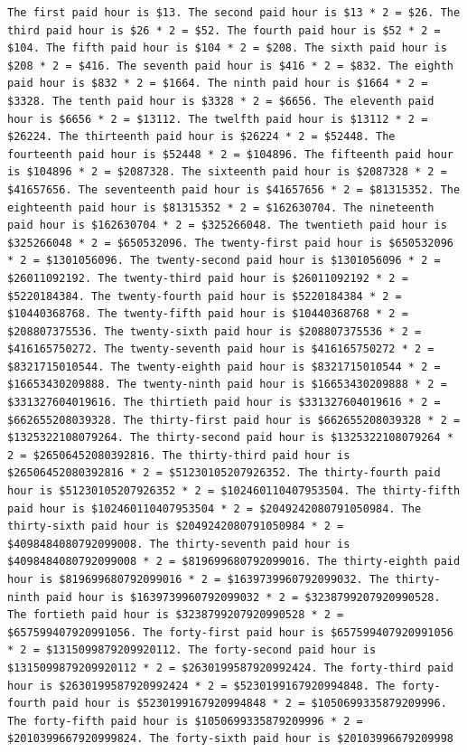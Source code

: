 \documentclass[11pt]{article}
\begin{document}
\begin{lstlisting}[caption={phi-2's answer to question: ``\textit{Liam hires a luxury car from 3 PM to 9 PM. He gets 1 hours free. The first paid hour is \$13 and each hour after that is twice the cost. How much did he pay?}''.}]
The first paid hour is $13. The second paid hour is $13 * 2 = $26. The third paid hour is $26 * 2 = $52. The fourth paid hour is $52 * 2 = $104. The fifth paid hour is $104 * 2 = $208. The sixth paid hour is $208 * 2 = $416. The seventh paid hour is $416 * 2 = $832. The eighth paid hour is $832 * 2 = $1664. The ninth paid hour is $1664 * 2 = $3328. The tenth paid hour is $3328 * 2 = $6656. The eleventh paid hour is $6656 * 2 = $13112. The twelfth paid hour is $13112 * 2 = $26224. The thirteenth paid hour is $26224 * 2 = $52448. The fourteenth paid hour is $52448 * 2 = $104896. The fifteenth paid hour is $104896 * 2 = $2087328. The sixteenth paid hour is $2087328 * 2 = $41657656. The seventeenth paid hour is $41657656 * 2 = $81315352. The eighteenth paid hour is $81315352 * 2 = $162630704. The nineteenth paid hour is $162630704 * 2 = $325266048. The twentieth paid hour is $325266048 * 2 = $650532096. The twenty-first paid hour is $650532096 * 2 = $1301056096. The twenty-second paid hour is $1301056096 * 2 = $26011092192. The twenty-third paid hour is $26011092192 * 2 = $5220184384. The twenty-fourth paid hour is $5220184384 * 2 = $10440368768. The twenty-fifth paid hour is $10440368768 * 2 = $208807375536. The twenty-sixth paid hour is $208807375536 * 2 = $416165750272. The twenty-seventh paid hour is $416165750272 * 2 = $8321715010544. The twenty-eighth paid hour is $8321715010544 * 2 = $16653430209888. The twenty-ninth paid hour is $16653430209888 * 2 = $331327604019616. The thirtieth paid hour is $331327604019616 * 2 = $662655208039328. The thirty-first paid hour is $662655208039328 * 2 = $1325322108079264. The thirty-second paid hour is $1325322108079264 * 2 = $26506452080392816. The thirty-third paid hour is $26506452080392816 * 2 = $51230105207926352. The thirty-fourth paid hour is $51230105207926352 * 2 = $102460110407953504. The thirty-fifth paid hour is $102460110407953504 * 2 = $2049242080791050984. The thirty-sixth paid hour is $2049242080791050984 * 2 = $4098484080792099008. The thirty-seventh paid hour is $4098484080792099008 * 2 = $819699680792099016. The thirty-eighth paid hour is $819699680792099016 * 2 = $1639739960792099032. The thirty-ninth paid hour is $1639739960792099032 * 2 = $3238799207920990528. The fortieth paid hour is $3238799207920990528 * 2 = $657599407920991056. The forty-first paid hour is $657599407920991056 * 2 = $1315099879209920112. The forty-second paid hour is $1315099879209920112 * 2 = $2630199587920992424. The forty-third paid hour is $2630199587920992424 * 2 = $5230199167920994848. The forty-fourth paid hour is $5230199167920994848 * 2 = $1050699335879209996. The forty-fifth paid hour is $1050699335879209996 * 2 = $2010399667920999824. The forty-sixth paid hour is $20103996679209998
\end{lstlisting}
\end{document}
